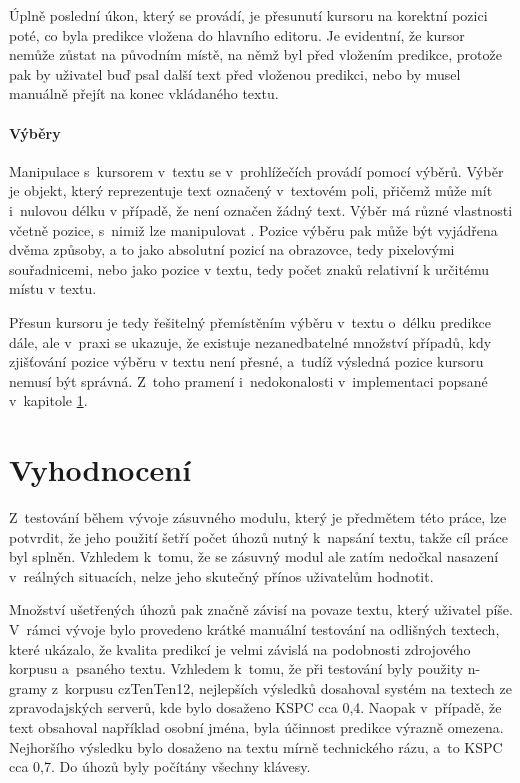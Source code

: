 \documentclass[a4paper,11pt,openany]{book} %
\begin{document}
Úplně poslední úkon, který se provádí, je přesunutí kursoru na korektní pozici poté, co byla predikce vložena do hlavního editoru. Je evidentní, že kursor nemůže zůstat na původním místě, na němž byl před vložením predikce, protože pak by uživatel buď psal další text před vloženou predikci, nebo by musel manuálně přejít na konec vkládaného textu. 

\subsubsection{Výběry}\label{vybery}

Manipulace s~kursorem v~textu se v~prohlížečích provádí pomocí výběrů. Výběr je objekt, který reprezentuje text označený v~textovém poli, přičemž může mít i~nulovou délku v případě, že není označen žádný text. Výběr má různé vlastnosti včetně pozice, s~nimiž lze manipulovat \parencite{mdn2015selections}. Pozice výběru pak může být vyjádřena dvěma způsoby, a to jako absolutní pozicí na obrazovce, tedy pixelovými souřadnicemi, nebo jako pozice v textu, tedy počet znaků relativní k určitému místu v textu. %

Přesun kursoru je tedy řešitelný přemístěním výběru v~textu o~délku predikce dále, ale v~praxi se ukazuje, že existuje nezanedbatelné množství případů, kdy zjišťování pozice výběru v textu není přesné, a~tudíž výsledná pozice kursoru nemusí být správná. Z~toho pramení i~nedokonalosti v~implementaci popsané v~kapitole \ref{vyhodnoceni}.

\chapter{Vyhodnocení}\label{vyhodnoceni}

Z~testování během vývoje zásuvného modulu, který je předmětem této práce, lze potvrdit, že jeho použití šetří počet úhozů nutný k~napsání textu, takže cíl práce byl splněn. Vzhledem k~tomu, že se zásuvný modul ale zatím nedočkal nasazení v~reálných situacích, nelze jeho skutečný přínos uživatelům hodnotit.

Množství ušetřených úhozů pak značně závisí na povaze textu, který uživatel píše. V~rámci vývoje bylo provedeno krátké manuální testování na odlišných textech, které ukázalo, že kvalita predikcí je velmi závislá na podobnosti zdrojového korpusu a~psaného textu. Vzhledem k~tomu, že při testování byly použity n-gramy z~korpusu czTenTen12, nejlepších výsledků dosahoval systém na textech ze zpravodajských serverů, kde bylo dosaženo KSPC cca 0,4. Naopak v~případě, že text obsahoval například osobní jména, byla účinnost predikce výrazně omezena. Nejhoršího výsledku bylo dosaženo na textu mírně technického rázu, a~to KSPC cca 0,7. Do úhozů byly počítány všechny klávesy.
\end{document}
